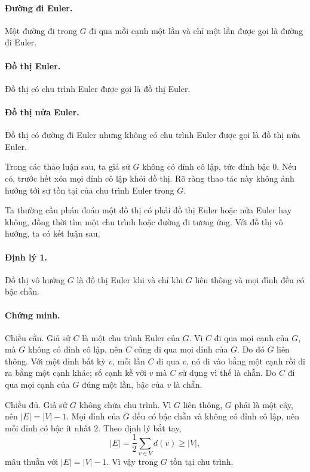\documentclass[11pt]{article}
\begin{document}
\paragraph{Đường đi Euler.}
Một đường đi trong \(G\) đi qua mỗi cạnh một lần và chỉ một lần được gọi là
đường đi Euler.

\paragraph{Đồ thị Euler.}
Đồ thị có chu trình Euler được gọi là đồ thị Euler.

\paragraph{Đồ thị nửa Euler.}
Đồ thị có đường đi Euler nhưng không có chu trình Euler được gọi là đồ thị nửa
Euler.

Trong các thảo luận sau, ta giả sử \(G\) không có đỉnh cô lập, tức đỉnh bậc
\(0\). Nếu có, trước hết xóa mọi đỉnh cô lập khỏi đồ thị. Rõ ràng thao tác này
không ảnh hưởng tới sự tồn tại của chu trình Euler trong \(G\).

Ta thường cần phán đoán một đồ thị có phải đồ thị Euler hoặc nửa Euler hay
không, đồng thời tìm một chu trình hoặc đường đi tương ứng. Với đồ thị vô
hướng, ta có kết luận sau.

\paragraph{Định lý 1.}
Đồ thị vô hướng \(G\) là đồ thị Euler khi và chỉ khi \(G\) liên thông và mọi
đỉnh đều có bậc chẵn.

\paragraph{Chứng minh.}
Chiều cần. Giả sử \(C\) là một chu trình Euler của \(G\). Vì \(C\) đi qua mọi
cạnh của \(G\), mà \(G\) không có đỉnh cô lập, nên \(C\) cũng đi qua mọi đỉnh
của \(G\). Do đó \(G\) liên thông. Với một đỉnh bất kỳ \(v\), mỗi lần \(C\) đi
qua \(v\), nó đi vào bằng một cạnh rồi đi ra bằng một cạnh khác; số cạnh kề
với \(v\) mà \(C\) sử dụng vì thế là chẵn. Do \(C\) đi qua mọi cạnh của \(G\)
đúng một lần, bậc của \(v\) là chẵn.

Chiều đủ. Giả sử \(G\) không chứa chu trình. Vì \(G\) liên thông, \(G\) phải là
một cây, nên \(|E|=|V|-1\). Mọi đỉnh của \(G\) đều có bậc chẵn và không có
đỉnh cô lập, nên mỗi đỉnh có bậc ít nhất \(2\). Theo định lý bắt tay,
\[
  |E|=\frac12\sum_{v\in V}d(v)\ge |V|,
\]
mâu thuẫn với \(|E|=|V|-1\). Vì vậy trong \(G\) tồn tại chu trình.
\end{document}
